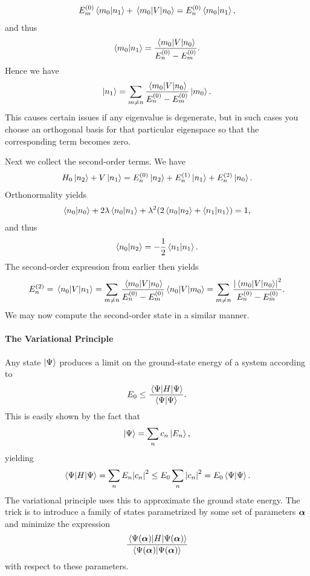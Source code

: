\begin{align*}
	E_{m}^{(0)}\braket{m_{0}}{n_{1}} + \mel{m_{0}}{V}{n_{0}} = E_{n}^{(0)}\braket{m_{0}}{n_{1}},
\end{align*}
and thus
\begin{align*}
	\braket{m_{0}}{n_{1}} = \frac{\mel{m_{0}}{V}{n_{0}}}{E_{n}^{(0)} - E_{m}^{(0)}}.
\end{align*}
Hence we have
\begin{align*}
	\ket{n_{1}} = \sum\limits_{m\neq n}\frac{\mel{m_{0}}{V}{n_{0}}}{E_{n}^{(0)} - E_{m}^{(0)}}\ket{m_{0}}.
\end{align*}
This causes certain issues if any eigenvalue is degenerate, but in such cases you choose an orthogonal basis for that particular eigenspace so that the corresponding term becomes zero.

Next we collect the second-order terms. We have
\begin{align*}
	H_{0}\ket{n_{2}} + V\ket{n_{1}} = E_{n}^{(0)}\ket{n_{2}} + E_{n}^{(1)}\ket{n_{1}} + E_{n}^{(2)}\ket{n_{0}}.
\end{align*}
Orthonormality yields
\begin{align*}
	\braket{n_{0}} + 2\lambda\braket{n_{0}}{n_{1}} + \lambda^{2}(2\braket{n_{0}}{n_{2}} + \braket{n_{1}}{n_{1}}) = 1,
\end{align*}
and thus
\begin{align*}
	\braket{n_{0}}{n_{2}} = -\frac{1}{2}\braket{n_{1}}{n_{1}}.
\end{align*}
The second-order expression from earlier then yields
\begin{align*}
	E_{n}^{(2)} = \mel{n_{0}}{V}{n_{1}} = \sum\limits_{m\neq n}\frac{\mel{m_{0}}{V}{n_{0}}}{E_{n}^{(0)} - E_{m}^{(0)}}\mel{n_{0}}{V}{m_{0}} = \sum\limits_{m\neq n}\frac{\abs{\mel{m_{0}}{V}{n_{0}}}^{2}}{E_{n}^{(0)} - E_{m}^{(0)}}.
\end{align*}
We may now compute the second-order state in a similar manner.

\paragraph{The Variational Principle}
Any state $\ket{\Psi}$ produces a limit on the ground-state energy of a system according to
\begin{align*}
	E_{0} \leq \frac{\expval{H}{\Psi}}{\braket{\Psi}}.
\end{align*}
This is easily shown by the fact that
\begin{align*}
	\ket{\Psi} = \sum\limits_{n}c_{n}\ket{E_{n}},
\end{align*}
yielding
\begin{align*}
	\expval{H}{\Psi} = \sum\limits_{n}E_{n}\abs{c_{n}}^{2} \leq E_{0}\sum\limits_{n}\abs{c_{n}}^{2} = E_{0}\braket{\Psi}.
\end{align*}
The variational principle uses this to approximate the ground state energy. The trick is to introduce a family of states parametrized by some set of parameters $\vb*{\alpha}$ and minimize the expression
\begin{align*}
	\frac{\expval{H}{\Psi(\vb*{\alpha})}}{\braket{\Psi(\vb*{\alpha})}}
\end{align*}
with respect to these parameters.

